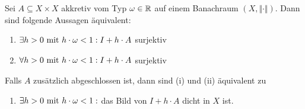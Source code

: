 \begin{theorem}
	Sei $A\subseteq X\times X$ akkretiv vom Typ $\omega\in\R$ auf einem Banachraum $(X,\Vert\cdot\Vert)$. 
	Dann sind folgende Aussagen äquivalent:
	\begin{enumerate}[label=(\roman*)]
		\item $\begin{aligned}
			\exists h>0\mit h\cdot\omega<1:I+h\cdot A
		\end{aligned}$ surjektiv
		\item $\begin{aligned}
			\forall h>0\mit h\cdot\omega<1: I+h\cdot A
		\end{aligned}$ surjektiv
	\end{enumerate}
	Falls $A$ zusätzlich abgeschlossen ist, dann sind (i) und (ii) äquivalent zu
	\begin{enumerate}[label=(iii)]
		\item $\begin{aligned}
			\exists h>0\mit h\cdot\omega<1:
		\end{aligned}$ das Bild von $I+h\cdot A$ dicht in $X$ ist.
	\end{enumerate}
\end{theorem}

